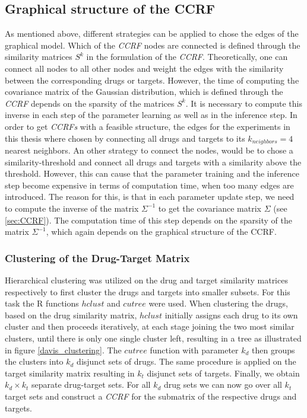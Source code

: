 \subsection{Graphical structure of the CCRF}
As mentioned above, different strategies can be applied to chose the edges of the graphical model. Which of the \textit{CCRF} nodes are connected is defined through the similarity matrices $S^k$ in the formulation of the \textit{CCRF}. Theoretically, one can connect all nodes to all other nodes and weight the edges with the similarity between the corresponding drugs or targets. However, the time of computing the covariance matrix of the Gaussian distribution, which is defined through the \textit{CCRF} depends on the sparsity of the matrices $S^k$. It is necessary to compute this inverse in each step of the parameter learning as well as in the inference step. In order to get \textit{CCRFs} with a feasible structure, the edges for the experiments in this thesis where chosen by connecting all drugs and targets to its $k_{neighbors}=4$ nearest neighbors. 
An other strategy to connect the nodes, would be to chose a similarity-threshold and connect all drugs and targets with a similarity above the threshold. However, this can cause that the parameter training and the inference step become expensive in terms of computation time, when too many edges are introduced. The reason for this, is that in each parameter update step, we need to compute the inverse of the matrix $\Sigma^{-1}$ to get the covariance matrix $\Sigma$ (see \ref{sec:CCRF}). The computation time of this step depends on the sparsity of the matrix $\Sigma^{-1}$, which again depends on the graphical structure of the CCRF.

\subsubsection{Clustering of the Drug-Target Matrix}
Hierarchical clustering was utilized on the drug and target similarity matrices respectively to first cluster the drugs and targets into smaller subsets. For this task the R functions $hclust$ and $cutree$ were used. When clustering the drugs, based on the drug similarity matrix, $hclust$ initially assigns each drug to its own cluster and then proceeds iteratively, at each stage joining the two most similar clusters, until there is only one single cluster left, resulting in a tree as illustrated in figure \ref{davis_clustering}. The $cutree$ function with parameter $k_d$ then groups the clusters into $k_d$ disjunct sets of drugs. The same procedure is applied on the target similarity matrix resulting in $k_t$ disjunct sets of targets. Finally, we obtain $k_d \times k_t$ separate drug-target sets. For all $k_d$ drug sets we can now go over all $k_t$ target sets and construct a \textit{CCRF} for the submatrix of the respective drugs and targets. 

